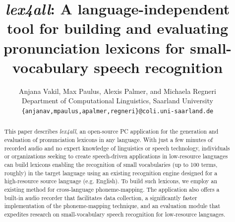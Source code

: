 \documentclass[11pt]{article}
\title{\textit{lex4all}: A language-independent tool for building and evaluating pronunciation lexicons for small-vocabulary speech recognition}
\author{Anjana Vakil, Max Paulus, Alexis Palmer, and Michaela Regneri \\
  Department of Computational Linguistics, %
  Saarland University \\
  {\tt \{anjanav,mpaulus,apalmer,regneri\}@coli.uni-saarland.de} \\}
\date{}
\begin{document}
\maketitle

\begin{abstract}
This paper describes \textit{lex4all}, an open-source PC application for the generation and evaluation of pronunciation lexicons in any language. 
With just a few minutes of recorded audio and no expert knowledge of linguistics or speech technology, individuals or organizations seeking to create speech-driven applications in low-resource languages can 
build  lexicons enabling 
the recognition of small vocabularies (up to 100 terms, roughly) in the target language
using an existing recognition engine designed for a high-resource source language (e.g. English). 
To build such lexicons, we employ an existing method for cross-language phoneme-mapping. 
The application also offers
a built-in audio recorder that facilitates data collection, 
a significantly faster implementation of the phoneme-mapping technique,
and an evaluation module that expedites research on small-vocabulary speech recognition for low-resource languages. 
\end{abstract}


%
\end{document}
